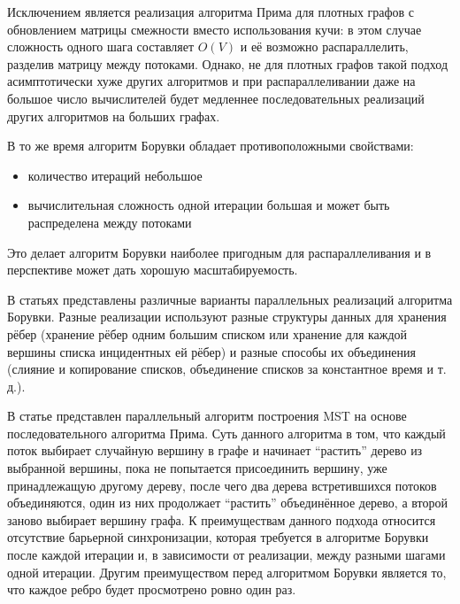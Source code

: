 \documentclass[a4paper,10pt]{extarticle}
\begin{document}
Исключением является реализация алгоритма Прима для плотных графов с обновлением матрицы смежности вместо использования кучи: в этом случае сложность одного шага составляет $O(V)$ и её возможно распараллелить, разделив матрицу между потоками. Однако, не для плотных графов такой подход асимптотически хуже других алгоритмов и при распараллеливании даже на большое число вычислителей будет медленнее последовательных реализаций других алгоритмов на больших графах.

В то же время алгоритм Борувки обладает противоположными свойствами:
\begin{itemize}
	\item количество итераций небольшое
	\item вычислительная сложность одной итерации большая и может быть распределена между потоками
\end{itemize}
Это делает алгоритм Борувки наиболее пригодным для распараллеливания и в перспективе может дать хорошую масштабируемость.

В статьях \cite{dense-mst,boruvka-prima,boruvka-cm5} представлены различные варианты параллельных реализаций алгоритма Борувки.
Разные реализации используют разные структуры данных для хранения рёбер (хранение рёбер одним большим списком или хранение для каждой вершины списка инцидентных ей рёбер) и разные способы их объединения (слияние и копирование списков, объединение списков за константное время и т. д.).

В статье \cite{boruvka-prima} представлен параллельный алгоритм построения MST на основе последовательного алгоритма Прима.
Суть данного алгоритма в том, что каждый поток выбирает случайную вершину в графе и начинает ``растить'' дерево из выбранной вершины, пока не попытается присоединить вершину, уже принадлежащую другому дереву, после чего два дерева встретившихся потоков объединяются, один из них продолжает ``растить'' объединённое дерево, а второй заново выбирает вершину графа. %
К преимуществам данного подхода относится отсутствие барьерной синхронизации, которая требуется в алгоритме Борувки после каждой итерации и, в зависимости от реализации, между разными шагами одной итерации. Другим преимуществом перед алгоритмом Борувки является то, что каждое ребро будет просмотрено ровно один раз.

\newpage
\end{document}
